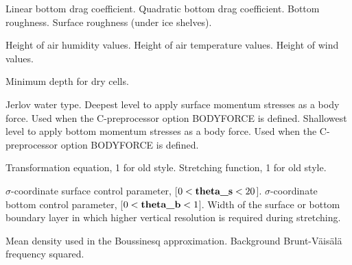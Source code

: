 \begin{klist}
    \mbox{}
     \begin{klist}
            Linear bottom drag coefficient.
           Quadratic bottom drag coefficient.
              Bottom roughness.
              Surface roughness (under ice shelves).
     \end{klist}
    \mbox{}
     \begin{klist}
        Height of air humidity values.
        Height of air temperature values.
        Height of wind values.
     \end{klist}
    \mbox{}
     \begin{klist}
         Minimum depth for dry cells.
     \end{klist}
    \mbox{}
     \begin{klist}
         Jerlov water type.
         Deepest level to apply surface momentum
     stresses as a body force.
            Used when the C-preprocessor option BODYFORCE is defined.
         Shallowest level to apply bottom momentum
    stresses as a body force.
            Used when the C-preprocessor option BODYFORCE is defined.
     \end{klist}
    \mbox{}
     \begin{klist}
        Transformation equation, 1 for old style.
        Stretching function, 1 for old style.
     \end{klist}
    \mbox{}
     \begin{klist}
         $\sigma$-coordinate surface control parameter,
     [$0 < \mbox{\bf theta\_s} < 20$].
         $\sigma$-coordinate bottom  control parameter,
     [$0 < \mbox{\bf theta\_b} < 1$].
          Width of the surface or bottom boundary layer
     in which higher vertical resolution is required during stretching.
     \end{klist}
    \mbox{}
     \begin{klist}
            Mean density used in the Boussinesq
     approximation.
        Background Brunt-V\"ais\"al\"a frequency squared.
     \end{klist}

\end{klist}
